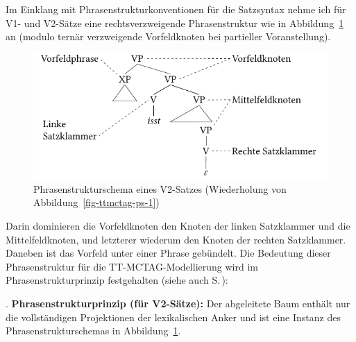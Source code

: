 Im Einklang mit Phrasenstrukturkonventionen für die Satzsyntax nehme ich für V1- und V2-Sätze eine rechtsverzweigende Phrasenstruktur wie in Abbildung~\ref{fig-ttmctag-ps-2} an (modulo ternär verzweigende Vorfeldknoten bei partieller Voranstellung).
\begin{figure}[t]
\centering
\includegraphics{graphics/abb726.pdf}
\caption{\label{fig-ttmctag-ps-2}Phrasenstrukturschema eines V2-Satzes (Wiederholung von Abbildung~\ref{fig-ttmctag-ps-1})}
\end{figure} 
Darin dominieren die Vorfeldknoten den Knoten der linken Satzklammer und die Mittelfeldknoten, und letzterer wiederum den Knoten der rechten Satzklammer. Daneben ist das Vorfeld unter einer Phrase gebündelt. Die Bedeutung dieser Phrasenstruktur für die TT-MCTAG-Modellierung wird im Phrasenstrukturprinzip festgehalten (siehe auch S.\,\pageref{ex-psprinzip}):

\ex. {\bf Phrasenstrukturprinzip (für V2-Sätze):}
Der abgeleitete Baum enthält nur die vollständigen Projektionen der lexikalischen Anker und ist eine Instanz des Phrasenstrukturschemas in Abbildung~\ref{fig-ttmctag-ps-2}.



